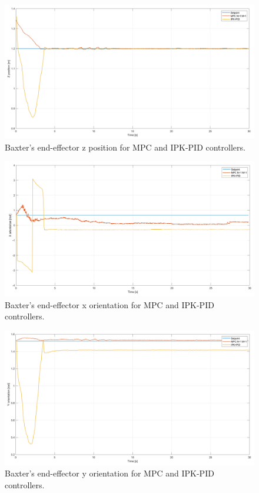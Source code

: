 \documentclass[11pt]{report} %
\begin{document}
\begin{figure}[H]
    \centering
    \includegraphics[width=1.0\linewidth]{assets/imgs/control_theory/mpc_vs_pid/z_pose.png}
    \caption{Baxter's end-effector z position for MPC and IPK-PID controllers.} 
    \label{fig_baxter_z_pose_mpc_pid_experiments}
\end{figure}

\begin{figure}[H]
    \centering
    \includegraphics[width=1.0\linewidth]{assets/imgs/control_theory/mpc_vs_pid/x_orientation.png}
    \caption{Baxter's end-effector x orientation for MPC and IPK-PID controllers.} 
    \label{fig_baxter_x_orientation_mpc_pid_experiments}
\end{figure}

\begin{figure}[H]
    \centering
    \includegraphics[width=1.0\linewidth]{assets/imgs/control_theory/mpc_vs_pid/y_orientation.png}
    \caption{Baxter's end-effector y orientation for MPC and IPK-PID controllers.} 
    \label{fig_baxter_y_orientation_mpc_pid_experiments}
\end{figure}
\end{document}
